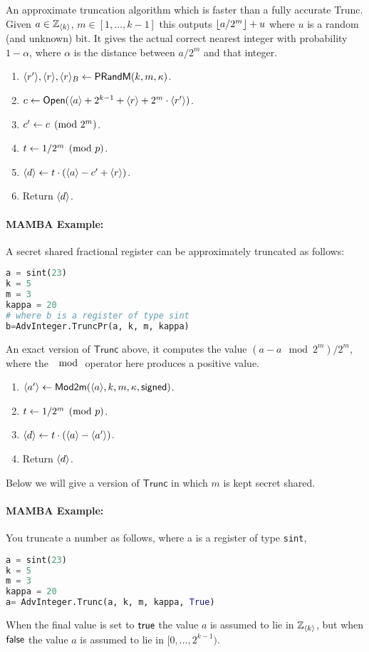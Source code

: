   An approximate truncation algorithm which is faster than
  a fully accurate Trunc.
  Given $a \in {\mathbb{Z}}_{\langle k \rangle}$, $m \in [1,\ldots,k-1]$
  this outputs ${\lfloor a/2^m \rfloor}+u$ where $u$ is a random
  (and unknown) bit.
  It gives the actual correct nearest integer with
  probability $1-\alpha$, where $\alpha$ is the distance
  between $a/2^m$ and that integer.
  \begin{enumerate}
    \item $\langle r' \rangle, \langle r \rangle, \langle r \rangle_B \leftarrow \mathsf{PRandM}(k,m,\kappa)$.
    \item $c \leftarrow {\mathsf{Open}}(\langle a \rangle+2^{k-1}+\langle r \rangle+2^m \cdot \langle r' \rangle)$.
    \item $c'\leftarrow c \pmod{2^m}$.
    \item $t \leftarrow 1/2^m \pmod{p}$.
    \item $\langle d \rangle \leftarrow t \cdot (\langle a \rangle-c'+\langle r \rangle)$.
    \item Return $\langle d \rangle$.
  \end{enumerate}
  \paragraph{MAMBA Example:} A secret shared fractional register can be approximately truncated as follows:
  \begin{lstlisting}[language={python}]
a = sint(23)
k = 5
m = 3
kappa = 20
# where b is a register of type sint
b=AdvInteger.TruncPr(a, k, m, kappa)
\end{lstlisting}

  An exact version of $\mathsf{Trunc}$ above, it computes the value
$(a-a \mod{2^m})/2^m$, where the $\mod$ operator here produces a positive value.
  \begin{enumerate}
    \item $\langle a' \rangle \leftarrow \mathsf{Mod2m}(\langle a \rangle,k,m, \kappa, {\mathsf{signed}})$.
    \item $t \leftarrow 1/2^m \pmod{p}$.
    \item $\langle d \rangle \leftarrow t \cdot (\langle a \rangle-\langle a' \rangle)$.
    \item Return $\langle d \rangle$.
  \end{enumerate}
  Below we will give a version of $\mathsf{Trunc}$ in which $m$ is kept secret shared.

  \paragraph{MAMBA Example:} You truncate a number as follows, where a is a register of type \verb|sint|,
  \begin{lstlisting}[language={python}]
a = sint(23)
k = 5
m = 3
kappa = 20
a= AdvInteger.Trunc(a, k, m, kappa, True)
\end{lstlisting}
When the final value is set to ${\mathsf{true}}$ the value $a$ is assumed to lie in ${\mathbb{Z}}_{\langle k \rangle}$,
but when ${\mathsf{false}}$ the value $a$ is assumed to lie in $[0,\ldots,2^{k-1})$.

